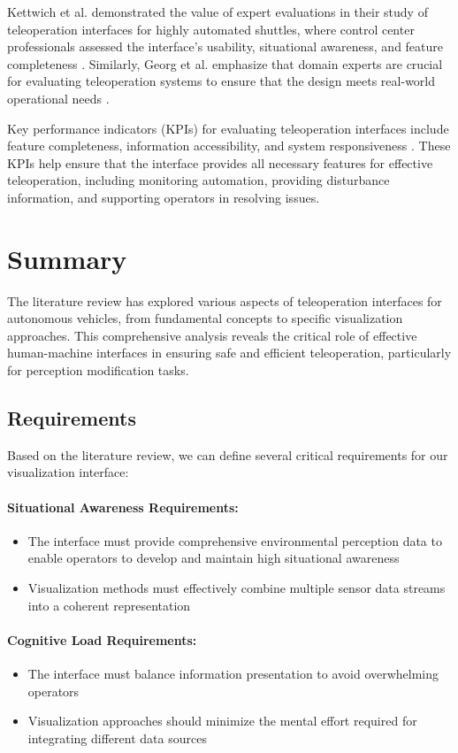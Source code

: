 Kettwich et al. demonstrated the value of expert evaluations in their study of teleoperation interfaces for highly automated shuttles, where control center professionals assessed the interface's usability, situational awareness, and feature completeness \cite{Kettwich}. Similarly, Georg et al. emphasize that domain experts are crucial for evaluating teleoperation systems to ensure that the design meets real-world operational needs \cite{Georg}.

Key performance indicators (KPIs) for evaluating teleoperation interfaces include feature completeness, information accessibility, and system responsiveness \cite{Brecht}. These KPIs help ensure that the interface provides all necessary features for effective teleoperation, including monitoring automation, providing disturbance information, and supporting operators in resolving issues.

\section{Summary}
The literature review has explored various aspects of teleoperation interfaces for autonomous vehicles, from fundamental concepts to specific visualization approaches. This comprehensive analysis reveals the critical role of effective human-machine interfaces in ensuring safe and efficient teleoperation, particularly for perception modification tasks.
\subsection{Requirements}
Based on the literature review, we can define several critical requirements for our visualization interface:
\paragraph{Situational Awareness Requirements:}
\begin{itemize}
    \item The interface must provide comprehensive environmental perception data to enable operators to develop and maintain high situational awareness
    \item Visualization methods must effectively combine multiple sensor data streams into a coherent representation
\end{itemize}
\paragraph{Cognitive Load Requirements:}
\begin{itemize}
    \item The interface must balance information presentation to avoid overwhelming operators
    \item Visualization approaches should minimize the mental effort required for integrating different data sources
\end{itemize}
